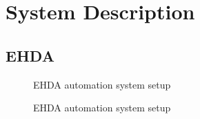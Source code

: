 \chapter[System Description]{System Description}
\label{chap:descricaoproblema}


\section{EHDA}
\label{sec:ehda_resume}

\begin{figure}[H]
  \centering
  \caption{EHDA automation system setup}
  \label{fig:ehda_setup}
\end{figure}


\begin{figure}[H]
  \centering
  \caption{EHDA automation system setup}
  \label{fig:setup_pic}
\end{figure}

